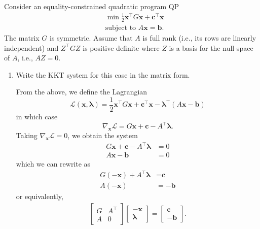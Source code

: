 \documentclass{../kin_math}
\begin{document}
\begin{questions}
  \question Consider an equality-constrained quadratic program QP
  \begin{align*}
    &\min \frac{1}{2} \textbf{x}^\top G \textbf{x} + \textbf{c}^\top \textbf{x} \\
    &\text{subject to } A \textbf{x} = \textbf{b}.
  \end{align*}
  The matrix $G$ is symmetric. Assume that $A$ is full rank (i.e., its rows are linearly independent) and $Z^\top GZ$ is positive definite where $Z$ is a basis for the null-space of $A$, i.e., $AZ = 0$.
  \begin{enumerate}
    \item Write the KKT system for this case in the matrix form.
    \begin{solution}
      From the above, we define the Lagrangian
      \begin{equation*}
        \mathcal{L}(\textbf{x}, \boldsymbol{\lambda}) = \frac{1}{2} \textbf{x}^\top G \textbf{x} + \textbf{c}^\top \textbf{x} - \boldsymbol{\lambda}^\top (A\textbf{x} - \textbf{b})
      \end{equation*}
      in which case
      \begin{equation*}
        \nabla_\textbf{x} \mathcal{L} = G \textbf{x} + \textbf{c} - A^\top \boldsymbol{\lambda}.
      \end{equation*}
      Taking $\nabla_\textbf{x} \mathcal{L} = 0$, we obtain the system
      \begin{align*}
        G \textbf{x} + \textbf{c} - A^\top \boldsymbol{\lambda} &= 0 \\
        A \textbf{x} - \textbf{b} &= 0
      \end{align*}
      which we can rewrite as
      \begin{align*}
        G (-\textbf{x}) + A^\top \boldsymbol{\lambda} &= \textbf{c} \\
        A (-\textbf{x}) &= - \textbf{b}
      \end{align*}
      or equivalently,
      \begin{align*}
        \begin{bmatrix} G & A^\top \\ A & 0 \end{bmatrix} \begin{bmatrix} -\textbf{x} \\ \boldsymbol{\lambda} \end{bmatrix} = \begin{bmatrix} \textbf{c} \\ -\textbf{b} \end{bmatrix}.

\end{align*}
\end{solution}
\end{enumerate}
\end{questions}
\end{document}
